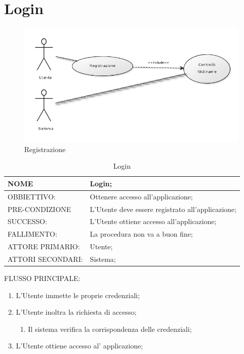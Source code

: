 \section{Login}
\begin{figure}[h!]
\centering
\includegraphics[scale=0.55]{img/registrazione.png}
\caption{Registrazione}
\label{fig:registrazione}
\end{figure}
\begin{table}[H]
\begin{tabular}{p{}|p{}}
\toprule
NOME & Login;\\
\hline
OBBIETTIVO: & Ottenere accesso all'applicazione;\\
\hline
PRE-CONDIZIONE & L'Utente deve essere registrato all'applicazione;\\
\hline
SUCCESSO: & L'Utente ottiene accesso all'applicazione;\\
\hline
FALLIMENTO: & La procedura non va a buon fine;\\
\hline
ATTORE PRIMARIO: & Utente;\\
\hline
ATTORI SECONDARI: & Sistema;\\
\bottomrule
\end{tabular}
\caption{Login}
\label{table:log}
\end{table}
FLUSSO PRINCIPALE:
\begin{enumerate}
\item L'Utente immette le proprie credenziali;
\item L'Utente inoltra la richiesta di accesso;
\begin{enumerate}
\item Il sistema verifica la corrispondenza delle credenziali;
\end{enumerate}
\item L'Utente ottiene accesso al' applicazione;
\end{enumerate}

